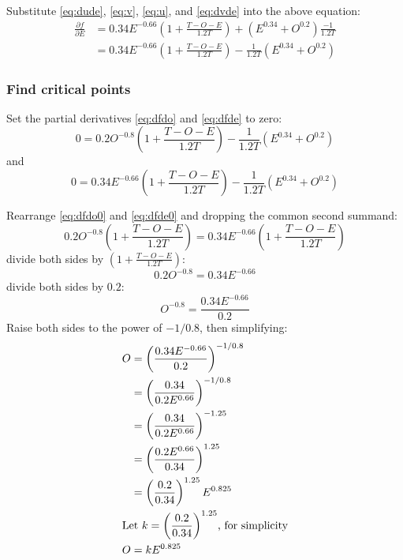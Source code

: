 \documentclass{article}
\begin{document}
Substitute \eqref{eq:dude}, \eqref{eq:v}, \eqref{eq:u}, and \eqref{eq:dvde} into the above equation:
\begin{equation}\label{eq:dfde}
  \begin{split}
  \frac{\partial f}{\partial E} & = 0.34E^{-0.66}\left(1 + \frac{T - O - E}{1.2T}\right) + \left(E^{0.34} + O^{0.2}\right)\frac{-1}{1.2T} \\
                                & = 0.34E^{-0.66}\left(1 + \frac{T - O - E}{1.2T}\right) - \frac{1}{1.2T}\left(E^{0.34} + O^{0.2}\right)
  \end{split}
\end{equation}


\subsubsection{Find critical points}

Set the partial derivatives \eqref{eq:dfdo} and \eqref{eq:dfde} to zero:
\begin{equation}\label{eq:dfdo0}
  0 = 0.2O^{-0.8}\left(1 + \frac{T - O - E}{1.2T}\right) - \frac{1}{1.2T}\left(E^{0.34} + O^{0.2}\right)
\end{equation}
and
\begin{equation}\label{eq:dfde0}
  0 = 0.34E^{-0.66}\left(1 + \frac{T - O - E}{1.2T}\right) - \frac{1}{1.2T}\left(E^{0.34} + O^{0.2}\right)
\end{equation}

Rearrange \eqref{eq:dfdo0} and \eqref{eq:dfde0} and dropping the common second summand:
\begin{equation}\label{eq:dfdo0r}
  0.2O^{-0.8}\left(1 + \frac{T - O - E}{1.2T}\right) = 0.34E^{-0.66}\left(1 + \frac{T - O - E}{1.2T}\right)
\end{equation}
divide both sides by $\left(1 + \frac{T - O - E}{1.2T}\right)$:
\begin{equation}\label{eq:dfdo0r2}
  0.2O^{-0.8} = 0.34E^{-0.66}
\end{equation}
divide both sides by $0.2$:
\begin{equation}\label{eq:dfdo0r3}
  O^{-0.8} = \frac{0.34E^{-0.66}}{0.2}
\end{equation}
Raise both sides to the power of $-1/0.8$, then simplifying:
\begin{equation}\label{eq:dfdo0r4}
  \begin{split}
    O & = \left(\frac{0.34E^{-0.66}}{0.2}\right)^{-1/0.8} \\
      & = \left(\frac{0.34}{0.2E^{0.66}}\right)^{-1/0.8} \\
      & = \left(\frac{0.34}{0.2E^{0.66}}\right)^{-1.25} \\
      & = \left(\frac{0.2E^{0.66}}{0.34}\right)^{1.25} \\
      & = \left(\frac{0.2}{0.34}\right)^{1.25}E^{0.825} \\
      \span \text{Let $k = \left(\frac{0.2}{0.34}\right)^{1.25}$, for simplicity} \\
      O & = kE^{0.825}
  \end{split}
\end{equation}
\end{document}
